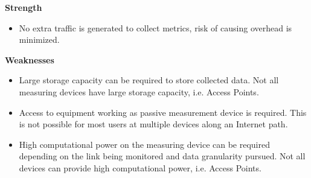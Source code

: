 \textbf{Strength}
\begin{itemize}
	\item No extra traffic is generated to collect metrics, risk of causing overhead is minimized.
\end{itemize}


\textbf{Weaknesses}
\begin{itemize}
	\item Large storage capacity can be required to store collected data. Not all measuring devices have large storage capacity, i.e. Access Points.
	\item Access to equipment working as passive measurement device is required. This is not possible for most users at multiple devices along an Internet path.
	\item High computational power on the measuring device can be required depending on the link being monitored and data granularity pursued. Not all devices can provide high computational power, i.e. Access Points.
\end{itemize}

